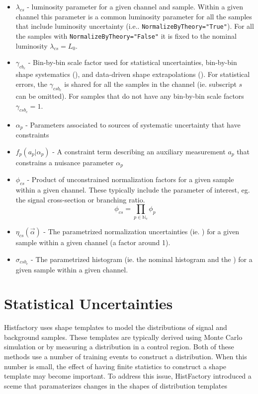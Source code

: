 \begin{itemize}
\item $ \lambda_{cs}$ - luminosity parameter for a given channel and sample.  Within a given channel this parameter is a common luminosity parameter for all the samples that include luminosity uncertainty (i.e.. \texttt{NormalizeByTheory="True"}).  For all the samples with  \texttt{NormalizeByTheory="False"} it is fixed to the nominal luminosity $\lambda_{cs}=L_0$.
\item $\gamma_{cb_e}$ - Bin-by-bin scale factor used for statistical uncertainties, bin-by-bin shape systematics (\SS), and data-driven shape extrapolations (\SF).  For statistical errors, the $\gamma_{csb_e}$ is shared for all the samples in the channel (ie. subscript $s$ can be omitted).  For samples that do not have any bin-by-bin scale factors $\gamma_{csb_e}=1$.
\item $\alpha_p$ - Parameters associated to sources of systematic uncertainty that have constraints
\item $f_p(a_p|\alpha_p)$ - A constraint term describing an auxiliary measurement $a_p$ that constrains a nuisance parameter $\alpha_p$
\item $ \phi_{cs}$ - Product of unconstrained normalization factors for a given sample within a given channel.  These typically include the parameter of interest, eg. the signal cross-section or branching ratio.
 \begin{equation}
 \phi_{cs}= \prod_{p\in\mathbb{N}_c} \phi_p
 \end{equation}
\item $\eta_{cs}(\vec\alpha)$  - The parametrized normalization uncertainties (ie. \OS) for a given sample within a given channel (a factor around 1).
\item $\sigma_{csb_e}$  - The parametrized histogram (ie. the nominal histogram and the \HS) for a given sample within a given channel.
\end{itemize}


\section{Statistical Uncertainties}
Histfactory uses shape templates to model the distributions of signal and background samples.
These templates are typically derived using Monte Carlo simulation or by measuring a distribution
in a control region.
Both of these methods use a number of training events to construct a distribution.
When this number is small, the effect of having finite statistics to construct a
shape template may become important.
To address this issue, HistFactory introduced a sceme that paramaterizes changes in the shapes
of distribution templates 









